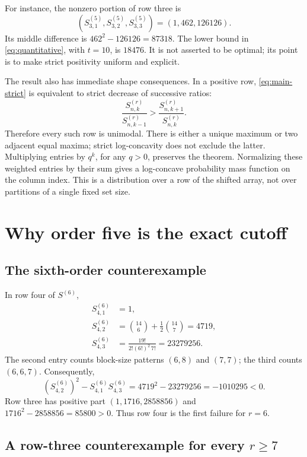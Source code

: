 \documentclass[11pt,a4paper]{article}
\numberwithin{equation}{section}
\theoremstyle{definition}
\theoremstyle{remark}
\begin{document}
For instance, the nonzero portion of row three is
\[
 (S^{(5)}_{3,1},S^{(5)}_{3,2},S^{(5)}_{3,3})=(1,462,126126).
\]
Its middle difference is $462^2-126126=87318$.
The lower bound in \eqref{eq:quantitative}, with $t=10$, is $18476$.
It is not asserted to be optimal; its point is to make strict positivity
uniform and explicit.

The result also has immediate shape consequences. In a positive row,
\eqref{eq:main-strict} is equivalent to strict decrease of successive
ratios:
\begin{equation}\label{eq:ratio-monotonicity}
 \frac{S^{(r)}_{n,k}}{S^{(r)}_{n,k-1}}
 >\frac{S^{(r)}_{n,k+1}}{S^{(r)}_{n,k}}.
\end{equation}
Therefore every such row is unimodal. There is either a unique maximum or
two adjacent equal maxima; strict log-concavity does not exclude the latter.
Multiplying entries by $q^k$, for any $q>0$, preserves the theorem.
Normalizing these weighted entries by their sum gives a log-concave
probability mass function on the column index. This is a distribution over
a row of the shifted array, not over partitions of a single fixed set size.

\section{Why order five is the exact cutoff}\label{sec:sharpness}

\subsection{The sixth-order counterexample}

In row four of $S^{(6)}$,
\begin{align*}
 S^{(6)}_{4,1}&=1,\\
 S^{(6)}_{4,2}&=\binom{14}{6}+\frac12\binom{14}{7}=4719,\\
 S^{(6)}_{4,3}&=\frac{19!}{2!(6!)^2\,7!}=23279256.
\end{align*}
The second entry counts block-size patterns $(6,8)$ and $(7,7)$; the third
counts $(6,6,7)$. Consequently,
\begin{equation}\label{eq:r6-counterexample}
 (S^{(6)}_{4,2})^2-S^{(6)}_{4,1}S^{(6)}_{4,3}
 =4719^2-23279256=-1010295<0.
\end{equation}
Row three has positive part $(1,1716,2858856)$ and
$1716^2-2858856=85800>0$. Thus row four is the first failure for $r=6$.

\subsection{A row-three counterexample for every $r\ge7$}
\end{document}
